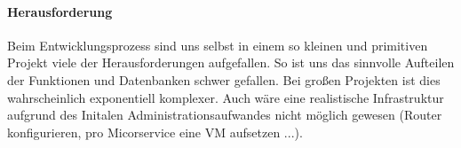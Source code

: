 \paragraph{Herausforderung}
Beim Entwicklungsprozess sind uns selbst in einem so kleinen und primitiven Projekt viele der Herausforderungen aufgefallen. So ist uns das sinnvolle Aufteilen der Funktionen und Datenbanken schwer gefallen. Bei großen Projekten ist dies wahrscheinlich exponentiell komplexer. \newline
Auch wäre eine realistische Infrastruktur aufgrund des Initalen Administrationsaufwandes nicht möglich gewesen (Router konfigurieren, pro Micorservice eine VM aufsetzen ...).

